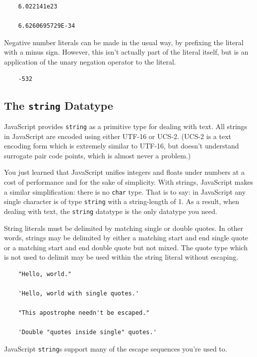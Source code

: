 \documentclass[11pt,letter]{book}
\begin{document}
    \begin{verbatim}
    6.022141e23
    
    6.6260695729E-34
    \end{verbatim}
    
    Negative number literals can be made in the usual way, by prefixing the literal with a minus 
    sign. However, this isn't actually part of the literal itself, but is an application of the 
    unary negation operator to the literal.
    
    \begin{verbatim}
    -532
    \end{verbatim}
    
    \subsection{The \texttt{string} Datatype}
    JavaScript provides \texttt{string} as a primitive type for dealing with text. All strings in 
    JavaScript are encoded using either UTF-16 or UCS-2. (UCS-2 is a text encoding form which is 
    extremely similar to UTF-16, but doesn't understand surrogate pair code points, which is almost
    never a problem.)
    
    You just learned that JavaScript unifies integers and floats under numbers at a cost of 
    performance and for the sake of simplicity. With strings, JavaScript makes a similar 
    simplification: there is no \texttt{char} type. That is to say: in JavaScript any single 
    character is of type \texttt{string} with a string-length of 1. As a result, when dealing with  
    text, the \texttt{string} datatype is the only datatype you need.
    
    String literals must be delimited by matching single or double quotes. In other words, strings 
    may be delimited by either a matching start and end single quote or a matching start and end 
    double quote but not mixed. The quote type which is not used to delimit may be used within the 
    string literal without escaping.
    
    \begin{verbatim}
    "Hello, world."
    
    'Hello, world with single quotes.'
    
    "This apostrophe needn't be escaped."
    
    'Double "quotes inside single" quotes.'
    \end{verbatim}
    
    JavaScript \texttt{string}s support many of the escape sequences you're used to.
    
\end{document}
